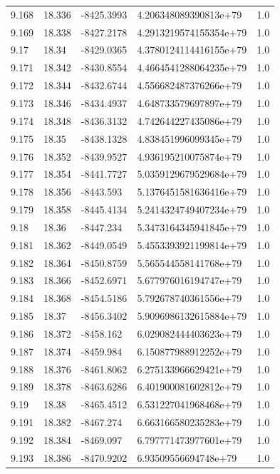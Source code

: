 \begin{tabular}{lllll}
9.168 & 18.336 & -8425.3993 & 4.206348089390813e+79 & 1.0 \\
9.169 & 18.338 & -8427.2178 & 4.2913219574155354e+79 & 1.0 \\
9.17 & 18.34 & -8429.0365 & 4.3780124114416155e+79 & 1.0 \\
9.171 & 18.342 & -8430.8554 & 4.4664541288064235e+79 & 1.0 \\
9.172 & 18.344 & -8432.6744 & 4.556682487376266e+79 & 1.0 \\
9.173 & 18.346 & -8434.4937 & 4.648733579697897e+79 & 1.0 \\
9.174 & 18.348 & -8436.3132 & 4.742644227435086e+79 & 1.0 \\
9.175 & 18.35 & -8438.1328 & 4.838451996099345e+79 & 1.0 \\
9.176 & 18.352 & -8439.9527 & 4.936195210075874e+79 & 1.0 \\
9.177 & 18.354 & -8441.7727 & 5.0359129679529684e+79 & 1.0 \\
9.178 & 18.356 & -8443.593 & 5.1376451581636416e+79 & 1.0 \\
9.179 & 18.358 & -8445.4134 & 5.2414324749407234e+79 & 1.0 \\
9.18 & 18.36 & -8447.234 & 5.3473164345941845e+79 & 1.0 \\
9.181 & 18.362 & -8449.0549 & 5.4553393921199814e+79 & 1.0 \\
9.182 & 18.364 & -8450.8759 & 5.565544558141768e+79 & 1.0 \\
9.183 & 18.366 & -8452.6971 & 5.677976016194747e+79 & 1.0 \\
9.184 & 18.368 & -8454.5186 & 5.792678740361556e+79 & 1.0 \\
9.185 & 18.37 & -8456.3402 & 5.9096986132615884e+79 & 1.0 \\
9.186 & 18.372 & -8458.162 & 6.029082444403623e+79 & 1.0 \\
9.187 & 18.374 & -8459.984 & 6.150877988912252e+79 & 1.0 \\
9.188 & 18.376 & -8461.8062 & 6.275133966629421e+79 & 1.0 \\
9.189 & 18.378 & -8463.6286 & 6.401900081602812e+79 & 1.0 \\
9.19 & 18.38 & -8465.4512 & 6.531227041968468e+79 & 1.0 \\
9.191 & 18.382 & -8467.274 & 6.663166580235283e+79 & 1.0 \\
9.192 & 18.384 & -8469.097 & 6.797771473977601e+79 & 1.0 \\
9.193 & 18.386 & -8470.9202 & 6.93509556694748e+79 & 1.0 \\

\end{tabular}
